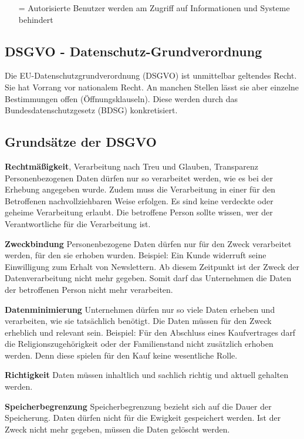 \documentclass[10pt]{article}
\begin{document}
\begin{itemize}
\item[=] Autorisierte Benutzer werden am Zugriff auf Informationen und Systeme behindert
\end{itemize}

\subsection{DSGVO - Datenschutz-Grundverordnung}

Die EU-Datenschutzgrundverordnung (DSGVO) ist unmittelbar geltendes Recht. Sie hat Vorrang vor nationalem Recht. An manchen Stellen lässt sie aber einzelne Bestimmungen offen (Öffnungsklauseln). Diese werden durch das Bundesdatenschutzgesetz (BDSG) konkretisiert.

\subsection{Grundsätze der DSGVO}

\textbf{Rechtmäßigkeit}, Verarbeitung nach Treu und Glauben, Transparenz
Personenbezogenen Daten dürfen nur so verarbeitet werden, wie es bei der Erhebung angegeben wurde. Zudem muss die Verarbeitung in einer für den Betroffenen nachvollziehbaren Weise erfolgen. Es sind keine verdeckte oder geheime Verarbeitung erlaubt. Die betroffene Person sollte wissen, wer der Verantwortliche für die Verarbeitung ist.

\textbf{Zweckbindung}
Personenbezogene Daten dürfen nur für den Zweck verarbeitet werden, für den sie erhoben wurden.
Beispiel:
Ein Kunde widerruft seine Einwilligung zum Erhalt von Newslettern. Ab diesem Zeitpunkt ist der Zweck der Datenverarbeitung nicht mehr gegeben. Somit darf das Unternehmen die Daten der betroffenen Person nicht mehr verarbeiten.

\textbf{Datenminimierung}
Unternehmen dürfen nur so viele Daten erheben und verarbeiten, wie sie tatsächlich benötigt. Die Daten müssen für den Zweck erheblich und relevant sein. 
Beispiel: 
Für den Abschluss eines Kaufvertrages darf die Religionszugehörigkeit oder der Familienstand nicht zusätzlich erhoben werden. Denn diese spielen für den Kauf keine wesentliche Rolle.

\textbf{Richtigkeit} 
	Daten müssen inhaltlich und sachlich richtig und aktuell gehalten werden.

\textbf{Speicherbegrenzung} 
Speicherbegrenzung bezieht sich auf die Dauer der Speicherung. Daten dürfen nicht für die Ewigkeit gespeichert werden. Ist der Zweck nicht mehr gegeben, müssen die Daten gelöscht werden.
	
\end{document}
